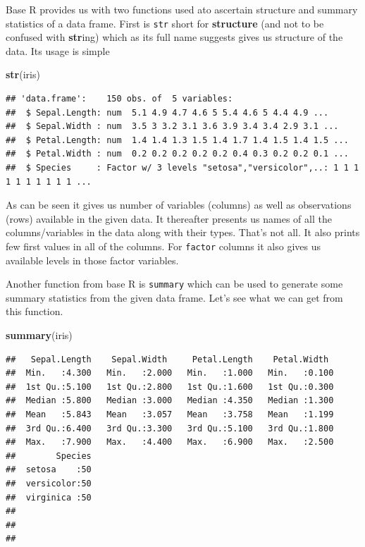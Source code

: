 \documentclass[
]{book}
\newenvironment{Shaded}{\begin{snugshade}}{\end{snugshade}}
\newcommand{\FunctionTok}[1]{\textcolor[rgb]{0.13,0.29,0.53}{\textbf{#1}}}
\newcommand{\NormalTok}[1]{#1}
\begin{document}
Base R provides us with two functions used ato ascertain structure and summary statistics of a data frame. First is \texttt{str} short for \textbf{structure} (and not to be confused with \textbf{str}ing) which as its full name suggests gives us structure of the data. Its usage is simple

\begin{Shaded}
\begin{Highlighting}[]
\FunctionTok{str}\NormalTok{(iris)}
\end{Highlighting}
\end{Shaded}

\begin{verbatim}
## 'data.frame':    150 obs. of  5 variables:
##  $ Sepal.Length: num  5.1 4.9 4.7 4.6 5 5.4 4.6 5 4.4 4.9 ...
##  $ Sepal.Width : num  3.5 3 3.2 3.1 3.6 3.9 3.4 3.4 2.9 3.1 ...
##  $ Petal.Length: num  1.4 1.4 1.3 1.5 1.4 1.7 1.4 1.5 1.4 1.5 ...
##  $ Petal.Width : num  0.2 0.2 0.2 0.2 0.2 0.4 0.3 0.2 0.2 0.1 ...
##  $ Species     : Factor w/ 3 levels "setosa","versicolor",..: 1 1 1 1 1 1 1 1 1 1 ...
\end{verbatim}

As can be seen it gives us number of variables (columns) as well as observations (rows) available in the given data. It thereafter presents us names of all the columns/variables in the data along with their types. That's not all. It also prints few first values in all of the columns. For \texttt{factor} columns it also gives us available levels in those factor variables.

Another function from base R is \texttt{summary} which can be used to generate some summary statistics from the given data frame. Let's see what we can get from this function.

\begin{Shaded}
\begin{Highlighting}[]
\FunctionTok{summary}\NormalTok{(iris)}
\end{Highlighting}
\end{Shaded}

\begin{verbatim}
##   Sepal.Length    Sepal.Width     Petal.Length    Petal.Width   
##  Min.   :4.300   Min.   :2.000   Min.   :1.000   Min.   :0.100  
##  1st Qu.:5.100   1st Qu.:2.800   1st Qu.:1.600   1st Qu.:0.300  
##  Median :5.800   Median :3.000   Median :4.350   Median :1.300  
##  Mean   :5.843   Mean   :3.057   Mean   :3.758   Mean   :1.199  
##  3rd Qu.:6.400   3rd Qu.:3.300   3rd Qu.:5.100   3rd Qu.:1.800  
##  Max.   :7.900   Max.   :4.400   Max.   :6.900   Max.   :2.500  
##        Species  
##  setosa    :50  
##  versicolor:50  
##  virginica :50  
##                 
##                 
## 
\end{verbatim}
\end{document}
